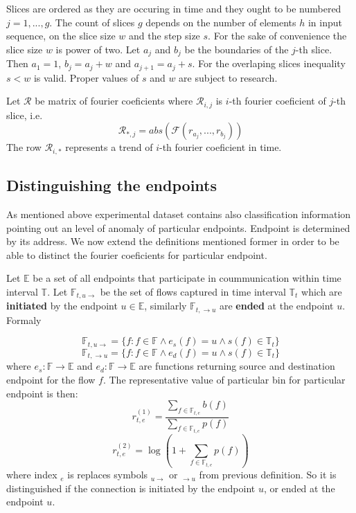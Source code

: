 \documentclass[a4paper]{IEEEtran}
\begin{document}
Slices are ordered as they are occuring in time and they ought to be numbered
$j = 1,..., g $. The count of slices $g$ depends on the number of elements $h$
in input sequence, on the slice size $w$ and the step size $s$.
For the sake of convenience the slice size $w$ is power of two.
Let $a_j$ and $b_j$ be the boundaries of the $j$-th slice. Then
$a_1 = 1$, $b_j = a_j + w$ and $a_{j+1} = a_j + s$.
For the overlaping slices inequality $s < w$ is valid.
Proper values of $s$ and $w$ are subject to research.

Let $\mathcal{R}$ be matrix of fourier coeficients where
$\mathcal{R}_{i,j}$ is $i$-th fourier coeficient of $j$-th slice,
i.e. 
\[
\mathcal{R}_{*,j} = abs(\mathcal{F}(r_{a_j}, ..., r_{b_j}))
\]
The row $\mathcal{R}_{i,*}$ represents a trend of $i$-th fourier
coeficient in time.

\subsection{Distinguishing the endpoints}
As mentioned above experimental dataset contains also
classification information pointing out an level of anomaly of 
particular endpoints. Endpoint is determined by its address.
We now extend the definitions mentioned
former in order to be able to distinct the fourier coeficients for
particular endpoint.

Let $\mathbb{E}$ be a set of all endpoints that
participate in coummunication within time interval $\mathbb{T}$.
Let $\mathbb{F}_{t,u \rightarrow}$ be the set of flows captured in
time interval $\mathbb{T}_{t}$ %
which are \textbf{initiated} by the endpoint $u \in \mathbb{E}$,
similarly $\mathbb{F}_{t, \rightarrow u}$ are \textbf{ended} at the
endpoint $u$. Formaly

\[
\mathbb{F}_{t,u \rightarrow} = \{f : f \in \mathbb{F} \wedge e_{s}(f) = u \wedge s(f) \in \mathbb{T}_t \}
\]
\[
\mathbb{F}_{t, \rightarrow u} = \{f : f \in \mathbb{F} \wedge e_{d}(f) = u \wedge s(f) \in \mathbb{T}_t \}
\]
where $e_{s}:\mathbb{F}\rightarrow \mathbb{E}$ and
$e_{d}:\mathbb{F}\rightarrow \mathbb{E}$ 
are functions returning source and destination endpoint for the 
flow $f$.
The representative value of particular bin for particular endpoint is 
then:
\[
r_{t,e}^{(1)} = \frac{\sum\limits_{f\in \mathbb{F}_{t,e}}b(f)}{\sum\limits_{f\in \mathbb{F}_{t,e}}p(f)}
\]
\[
r_{t,e}^{(2)} = \log(1+\sum\limits_{f\in \mathbb{F}_{t,e}}p(f))
\]
where index ${}_e$ is replaces symbols ${}_{u\rightarrow}$ or 
${}_{\rightarrow u}$ from previous definition. So it is distinguished 
if the connection is initiated by the endpoint $u$, or ended at the
endpoint $u$.
\end{document}

